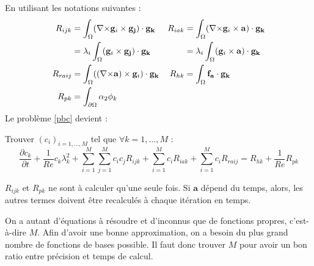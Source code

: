 En utilisant les notations suivantes :
\begin{align*}
  R_{ijk} &= \int_\Omega({\nabla\times}\mathbf{g}_i\times \mathbf{g_j})\cdot\mathbf{g_k} & R_{iak} &= \int_\Omega({\nabla\times}\mathbf{g}_i\times \mathbf{a})\cdot\mathbf{g_k}\\
  &= \lambda_i\int_\Omega(\mathbf{g}_i\times \mathbf{g_j})\cdot\mathbf{g_k} & &= \lambda_i\int_\Omega(\mathbf{g}_i\times \mathbf{a})\cdot\mathbf{g_k}\\
R_{raij} &= \int_\Omega(({\nabla\times}\mathbf{a})\times \mathbf{g}_i)\cdot\mathbf{g_k} & R_{hk} &= \int_\Omega\mathbf{f_a}\cdot\mathbf{g_k}\\
R_{pk} &= \int_{\partial\Omega} \alpha_2\phi_k
\end{align*}
Le problème \ref{pbc} devient :
\begin{pb}\label{fvc}
Trouver $(c_i)_{i=1,\dots,M}$ tel que $\forall k=1,\dots,M$ :
\begin{equation*}
\frac{\partial c_k}{\partial t} + \frac{1}{Re}c_k\lambda_k^2 + \sum_{i=1}^M\sum_{j=1}^Mc_ic_jR_{ijk} + \sum_{i=1}^Mc_iR_{iak} + \sum_{i=1}^Mc_iR_{raij} = R_{hk} + \frac{1}{Re}R_{pk}
\end{equation*}\end{pb}

\begin{rk}
$R_{ijk}$ et $R_{pk}$ ne sont à calculer qu'une seule fois. Si $\mathbf{a}$ dépend du temps, alors, les autres termes doivent être recalculés à chaque itération en temps.
\end{rk}
\begin{rk}
On a autant d'équations à résoudre et d'inconnus que de fonctions propres, c'est-à-dire $M$. Afin d'avoir une bonne approximation, on a besoin du plus grand nombre de fonctions de bases possible. Il faut donc trouver $M$ pour avoir un bon ratio entre précision et temps de calcul.
\end{rk}

